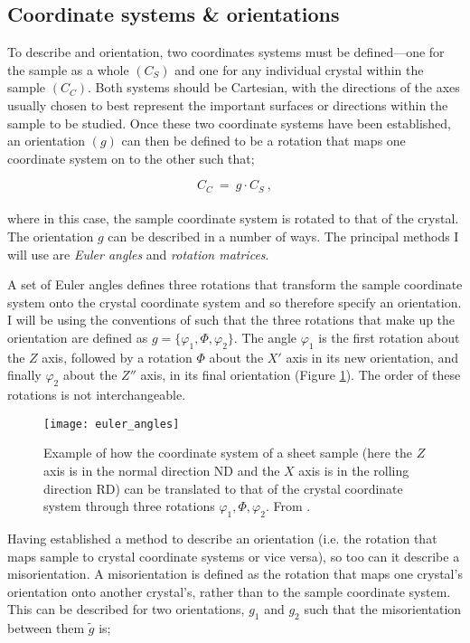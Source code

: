 \documentclass[a4paper,12pt,twoside]{report}
\numberwithin{equation}{chapter}
\begin{document}
\subsection{Coordinate systems \& orientations} \label{subsec:coordinates}
To describe and orientation, two coordinates systems must be defined---one for the sample as a whole $(C_S)$ and one for any individual crystal within the sample $(C_C)$. Both systems should be Cartesian, with the directions of the axes usually chosen to best represent the important surfaces or directions within the sample to be studied. Once these two coordinate systems have been established, an orientation $(g)$ can then be defined to be a rotation that maps one coordinate system on to the other such that;



\begin{equation}
C_C\ =\ g \cdot C_S\ ,
\end{equation}  
\\
where in this case, the sample coordinate system is rotated to that of the crystal. The orientation $g$ can be described in a number of ways. The principal methods I will use are \emph{Euler angles} and \emph{rotation matrices}.


A set of Euler angles defines three rotations that transform the sample coordinate system onto the crystal coordinate system and so therefore specify an orientation. I will be using the conventions of \cite{bunge1982texture} such that the three rotations that make up the orientation are defined as $g = \{\varphi_1,\Phi,\varphi_2\}$. The angle $\varphi_1$ is the first rotation about the $Z$ axis, followed by a rotation $\Phi$ about the $X'$ axis in its new orientation, and finally $\varphi_2$ about the $Z''$ axis, in its final orientation (Figure \ref{fig:euler_angles}). The order of these rotations is not interchangeable.




\begin{figure}[h!]
  \centering
    \texttt{[image: euler\_angles]}
  \caption[Euler angle description]{Example of how the coordinate system of a sheet sample (here the $Z$ axis is in the normal direction ND and the $X$ axis is in the rolling direction RD) can be translated to that of the crystal coordinate system through three rotations $\varphi_1,\Phi,\varphi_2$. From \cite{Randle2000}.}
  \label{fig:euler_angles}
\end{figure}

Having established a method to describe an orientation (i.e. the rotation that maps sample to crystal coordinate systems or vice versa), so too can it describe a misorientation. A misorientation is defined as the rotation that maps one crystal's orientation onto another crystal's, rather than to the sample coordinate system. This can be described for two orientations, $g_1$ and $g_2$ such that the misorientation between them $\tilde{g}$ is;
\end{document}
